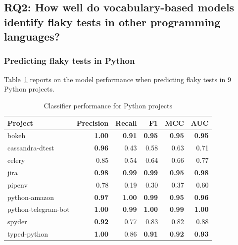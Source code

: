 
\subsection{RQ2: How well do vocabulary-based models identify flaky tests in other programming languages?}
\subsubsection{Predicting flaky tests in Python}
Table~\ref{python} reports on the model performance when predicting flaky tests in 9 Python projects. 

\begin{table}[t]
\centering
\vspace{1.0em}
\caption{Classifier performance for Python projects}
\label{python}
 \begin{tabular}{l|r r r r r} 
 \hline
 \textbf{Project} & \textbf{Precision} & \textbf{Recall} & \textbf{F1} & \textbf{MCC} & \textbf{AUC} \\ [0.25ex]
 \hline
 bokeh & \textbf{1.00} & \textbf{0.91} & \textbf{0.95} & \textbf{0.95} & \textbf{0.95} \\
 cassandra-dtest & \textbf{0.96} & 0.43 & 0.58 & 0.63 & 0.71 \\
 celery & 0.85 & 0.54 & 0.64 & 0.66 & 0.77 \\
 jira & \textbf{0.98} & \textbf{0.99} & \textbf{0.99} & \textbf{0.95} & \textbf{0.98} \\
 pipenv & 0.78 & 0.19 & 0.30 & 0.37 & 0.60 \\ 
 python-amazon & \textbf{0.97} & \textbf{1.00} & \textbf{0.99} & \textbf{0.95} & \textbf{0.96} \\ 
 python-telegram-bot & \textbf{1.00} & \textbf{0.99} & \textbf{1.00} & \textbf{0.99} & \textbf{1.00} \\ 
 spyder & \textbf{0.92} & 0.77 & 0.83 & 0.82 & 0.88 \\ 
 typed-python & \textbf{1.00} & 0.86 & \textbf{0.91} & \textbf{0.92} & \textbf{0.93} \\ 
 \hline
\end{tabular}
\vspace{1.0em}
\end{table}

